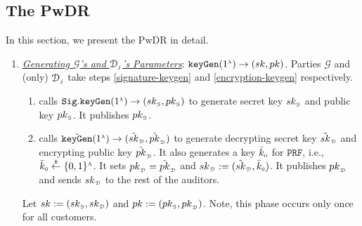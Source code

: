 \subsection{The PwDR}\label{sec::PwDR-auditorprotocol}
In this section, we present the PwDR in detail. 




\begin{enumerate}[leftmargin=.46cm]

\item \underline{\textit{Generating $\mathcal{G}$'s and  $\mathcal{D}_{\scriptscriptstyle j}$'s  Parameters}}:  $\mathtt{keyGen}(1^{\scriptscriptstyle \lambda})\rightarrow (sk,pk)$. Parties $\mathcal{G}$ and (only) $\mathcal{D}_{\scriptscriptstyle j}$   take   steps \ref{signature-keygen} and   \ref{encryption-keygen} respectively. 

\vspace{.1mm}

\begin{enumerate}
\item\label{signature-keygen} calls $\mathtt{Sig.keyGen}(1^{\scriptscriptstyle \lambda})\rightarrow (sk_{\scriptscriptstyle\mathcal{G}}, pk_{\scriptscriptstyle\mathcal{G}})$ to generate   secret key $sk_{\scriptscriptstyle\mathcal{G}}$ and   public key $pk_{\scriptscriptstyle\mathcal{G}}$. It publishes  $pk_{\scriptscriptstyle\mathcal{G}}$.
%
\



\item\label{encryption-keygen} calls $\tilde{\mathtt{keyGen}}(1^{\scriptscriptstyle\lambda})\rightarrow(\tilde{sk}_{\scriptscriptstyle\mathcal {D}}, \tilde{pk}_{\scriptscriptstyle\mathcal {D}})$ to generate  decrypting secret key $\tilde{sk}_{\scriptscriptstyle\mathcal {D}}$ and encrypting public key $\tilde{pk}_{\scriptscriptstyle\mathcal {D}}$. It also generates a key $\bar k_{\scriptscriptstyle 0}$ for $\mathtt{PRF}$, i.e., $\bar k_{\scriptscriptstyle 0}\stackrel{\scriptscriptstyle\$}\leftarrow\{0,1\}^{\scriptscriptstyle\Lambda}$. It sets ${pk}_{\scriptscriptstyle\mathcal{D}}=\tilde {pk}_{\scriptscriptstyle\mathcal{D}}$ and ${sk}_{\scriptscriptstyle\mathcal {D}}:=(\tilde{sk}_{\scriptscriptstyle\mathcal {D}}, \bar k_{\scriptscriptstyle 0})$. It publishes ${pk}_{\scriptscriptstyle\mathcal {D}}$ and sends ${sk}_{\scriptscriptstyle\mathcal {D}}$ to the rest of the auditors.
\end{enumerate}


Let $sk:=(sk_{\scriptscriptstyle\mathcal{G}}, sk_{\scriptscriptstyle\mathcal{D}})$ and $pk:=(pk_{\scriptscriptstyle\mathcal{G}}, {pk}_{\scriptscriptstyle\mathcal{D}})$. Note, this phase occurs only once for all customers.


\end{enumerate}
